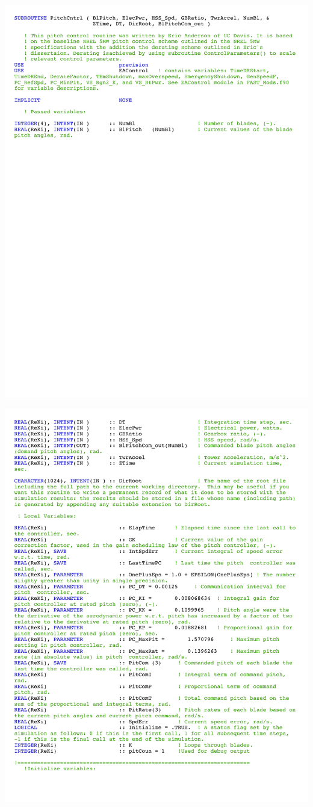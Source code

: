 \noindent
\includegraphics[width=\linewidth]{Figures/AppendixDFigures/figD-1A.pdf}

\noindent
\includegraphics[width=\linewidth]{Figures/AppendixDFigures/figD-1B.pdf}

